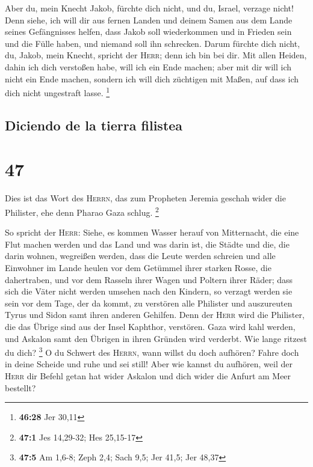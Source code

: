  Aber du, mein Knecht Jakob, fürchte dich nicht, und du,
Israel, verzage nicht! Denn siehe, ich will dir aus fernen Landen und
deinem Samen aus dem Lande seines Gefängnisses helfen, dass Jakob soll
wiederkommen und in Frieden sein und die Fülle haben, und niemand soll
ihn schrecken.  Darum fürchte dich nicht, du, Jakob, mein
Knecht, spricht der \textsc{Herr}; denn ich bin bei dir. Mit allen
Heiden, dahin ich dich verstoßen habe, will ich ein Ende machen; aber
mit dir will ich nicht ein Ende machen, sondern ich will dich züchtigen
mit Maßen, auf dass ich dich nicht ungestraft lasse. \footnote{\textbf{46:28}
  Jer 30,11}

\hypertarget{diciendo-de-la-tierra-filistea}{%
\subsection{Diciendo de la tierra
filistea}\label{diciendo-de-la-tierra-filistea}}

\hypertarget{section-46}{%
\section{47}\label{section-46}}

 Dies ist das Wort des \textsc{Herrn}, das zum Propheten
Jeremia geschah wider die Philister, ehe denn Pharao Gaza schlug.
\footnote{\textbf{47:1} Jes 14,29-32; Hes 25,15-17}

 So spricht der \textsc{Herr}: Siehe, es kommen Wasser
herauf von Mitternacht, die eine Flut machen werden und das Land und was
darin ist, die Städte und die, die darin wohnen, wegreißen werden, dass
die Leute werden schreien und alle Einwohner im Lande heulen
 vor dem Getümmel ihrer starken Rosse, die dahertraben,
und vor dem Rasseln ihrer Wagen und Poltern ihrer Räder; dass sich die
Väter nicht werden umsehen nach den Kindern, so verzagt werden sie sein
 vor dem Tage, der da kommt, zu verstören alle Philister
und auszureuten Tyrus und Sidon samt ihren anderen Gehilfen. Denn der
\textsc{Herr} wird die Philister, die das Übrige sind aus der Insel
Kaphthor, verstören.  Gaza wird kahl werden, und Askalon
samt den Übrigen in ihren Gründen wird verderbt. Wie lange ritzest du
dich? \footnote{\textbf{47:5} Am 1,6-8; Zeph 2,4; Sach 9,5; Jer 41,5;
  Jer 48,37}  O du Schwert des \textsc{Herrn}, wann willst
du doch aufhören? Fahre doch in deine Scheide und ruhe und sei still!
 Aber wie kannst du aufhören, weil der \textsc{Herr} dir
Befehl getan hat wider Askalon und dich wider die Anfurt am Meer
bestellt?

